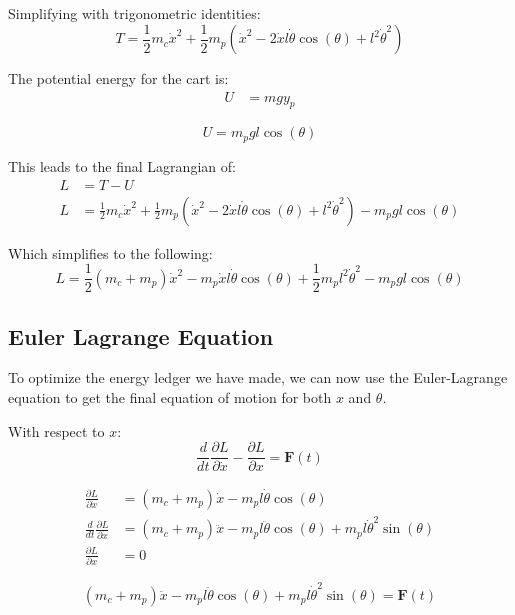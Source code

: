 \documentclass{article}
\newcommand{\pfrac}[2]{\frac{\partial #1}{\partial #2}}
\begin{document}
Simplifying with trigonometric identities:
\begin{equation}
	T = \frac{1}{2}m_c \dot{x}^2
	+ \frac{1}{2}m_p (
	\dot{x}^2 - 2\dot{x}l\dot{\theta}\cos(\theta) + l^2 \dot{\theta}^2
	)
\end{equation}

The potential energy for the cart is:
\begin{align*}
	U & = mgy_p
\end{align*}

\begin{equation}
	U = m_pgl\cos(\theta)
\end{equation}

This leads to the final Lagrangian of:
\begin{align*}
	L & = T - U                    \\
	L & = \frac{1}{2}m_c \dot{x}^2
	+ \frac{1}{2}m_p (
	\dot{x}^2 - 2\dot{x}l\dot{\theta}\cos(\theta) + l^2 \dot{\theta}^2
	)
	- m_pgl\cos(\theta)
\end{align*}

Which simplifies to the following:
\begin{equation}
	L = \frac{1}{2}(m_c + m_p)\dot{x}^2
	- m_p\dot{x}l\dot{\theta}\cos(\theta) + \frac{1}{2} m_p l^2 \dot{\theta}^2
	- m_pgl\cos(\theta)
\end{equation}

\subsection{Euler Lagrange Equation}
To optimize the energy ledger we have made, we can now use the Euler-Lagrange
equation to get the final equation of motion for both $x$ and $\theta$.

With respect to $x$:
$$
	\frac{d}{dt} \pfrac{L}{\dot{x}} - \pfrac{L}{x} = \mathbf{F}(t)
$$

\begin{align}
	\pfrac{L}{\dot{x}}              & = (m_c + m_p)\dot{x} - m_p l \dot{\theta}\cos(\theta)                                    \\
	\frac{d}{dt} \pfrac{L}{\dot{x}} & = (m_c + m_p)\ddot{x} - m_p l \ddot{\theta}\cos(\theta) + m_pl\dot{\theta}^2\sin(\theta) \\
	\pfrac{L}{x}                    & = 0
\end{align}

\begin{equation}
	(m_c + m_p)\ddot{x} - m_pl\ddot{\theta}\cos(\theta) + m_pl\dot{\theta}^2\sin(\theta) = \mathbf{F}(t)
\end{equation}
\end{document}
